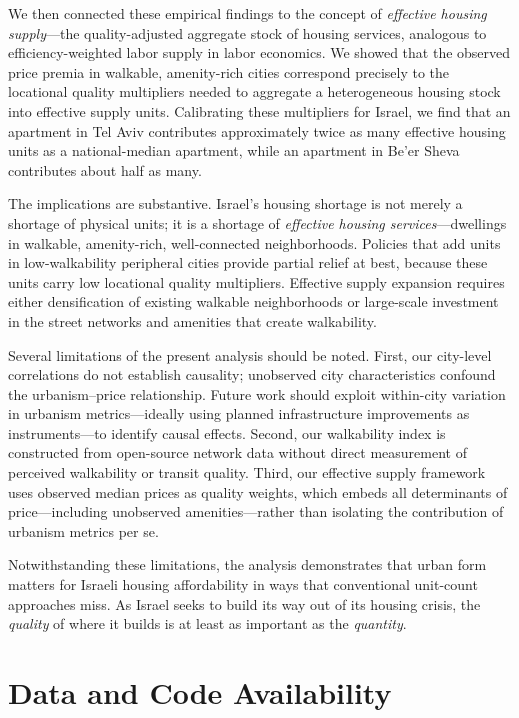 \documentclass[12pt,a4paper]{article}
\begin{document}
We then connected these empirical findings to the concept of \textit{effective
housing supply}—the quality-adjusted aggregate stock of housing services,
analogous to efficiency-weighted labor supply in labor economics.  We showed that
the observed price premia in walkable, amenity-rich cities correspond precisely
to the locational quality multipliers needed to aggregate a heterogeneous housing
stock into effective supply units.  Calibrating these multipliers for Israel, we
find that an apartment in Tel Aviv contributes approximately twice as many
effective housing units as a national-median apartment, while an apartment in
Be'er Sheva contributes about half as many.

The implications are substantive.  Israel's housing shortage is not merely a
shortage of physical units; it is a shortage of \textit{effective housing
services}—dwellings in walkable, amenity-rich, well-connected neighborhoods.
Policies that add units in low-walkability peripheral cities provide partial
relief at best, because these units carry low locational quality multipliers.
Effective supply expansion requires either densification of existing walkable
neighborhoods or large-scale investment in the street networks and amenities
that create walkability.

Several limitations of the present analysis should be noted.  First, our
city-level correlations do not establish causality; unobserved city
characteristics confound the urbanism–price relationship.  Future work should
exploit within-city variation in urbanism metrics—ideally using planned
infrastructure improvements as instruments—to identify causal effects.
Second, our walkability index is constructed from open-source network data
without direct measurement of perceived walkability or transit quality.
Third, our effective supply framework uses observed median prices as quality
weights, which embeds all determinants of price—including unobserved
amenities—rather than isolating the contribution of urbanism metrics per se.

Notwithstanding these limitations, the analysis demonstrates that urban form
matters for Israeli housing affordability in ways that conventional unit-count
approaches miss.  As Israel seeks to build its way out of its housing crisis,
the \textit{quality} of where it builds is at least as important as the
\textit{quantity}.

\section*{Data and Code Availability}
\end{document}
